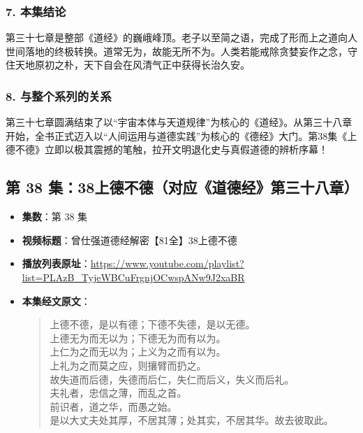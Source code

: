 \subsubsection{7. 本集结论}
第三十七章是整部《道经》的巍峨峰顶。老子以至简之语，完成了形而上之道向人世间落地的终极转换。道常无为，故能无所不为。人类若能戒除贪婪妄作之念，守住天地原初之朴，天下自会在风清气正中获得长治久安。

\subsubsection{8. 与整个系列的关系}
第三十七章圆满结束了以“宇宙本体与天道规律”为核心的《道经》。从第三十八章开始，全书正式迈入以“人间运用与道德实践”为核心的《德经》大门。第38集《上德不德》立即以极其震撼的笔触，拉开文明退化史与真假道德的辨析序幕！

\clearpage

\subsection{第 38 集：38上德不德（对应《道德经》第三十八章）}
\label{sec:ep38}

\begin{itemize}
    \item \textbf{集数}：第 38 集
    \item \textbf{视频标题}：曾仕强道德经解密【81全】38上德不德
    \item \textbf{播放列表原址}：\url{https://www.youtube.com/playlist?list=PLAzB_TyjeWBCuFrgnjOCwspANw9J2xaBR}
    \item \textbf{本集经文原文}：
    \begin{quote}\kaishu
    上德不德，是以有德；下德不失德，是以无德。\\
    上德无为而无以为；下德无为而有以为。\\
    上仁为之而无以为；上义为之而有以为。\\
    上礼为之而莫之应，则攘臂而扔之。\\
    故失道而后德，失德而后仁，失仁而后义，失义而后礼。\\
    夫礼者，忠信之薄，而乱之首。\\
    前识者，道之华，而愚之始。\\
    是以大丈夫处其厚，不居其薄；处其实，不居其华。故去彼取此。
    \end{quote}
\end{itemize}

